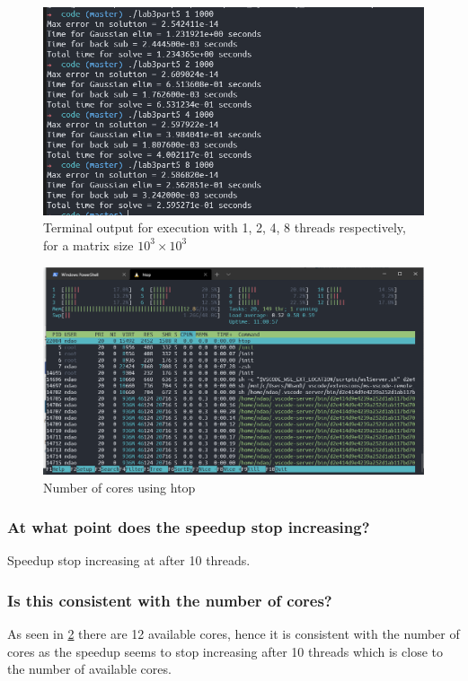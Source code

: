 \begin{figure}[ht]
	\centering
	\includegraphics[width=\textwidth]{graphics/P5_c_terminal_output.PNG}
	\caption{Terminal output for execution with 1, 2, 4, 8 threads respectively,
	for a matrix size $10^3 \times 10^3$}
	\label{fig:lab3part3c_ii}
\end{figure}

\begin{figure}[ht]
	\centering
	\includegraphics[width=\textwidth]{graphics/P5_c_cores.PNG}
	\caption{Number of cores using htop}
	\label{fig:lab3part3c_iii}
\end{figure}

\subsubsection{At what point does the speedup stop increasing?}
Speedup stop increasing at after 10 threads.

\subsubsection{Is this consistent with the number of cores?}
As seen in \cref{fig:lab3part3c_iii} there are 12 available cores,
hence it is consistent with the number of cores as the speedup seems
to stop increasing after 10 threads which is close to the number
of available cores.


